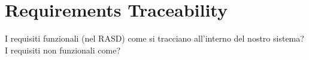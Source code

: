 \documentclass[../../dd.tex]{subfiles}
\begin{document}
	\chapter{Requirements Traceability}
		I requisiti funzionali (nel RASD) come si tracciano all'interno del nostro sistema?
		I requisiti non funzionali come?
\end{document}
